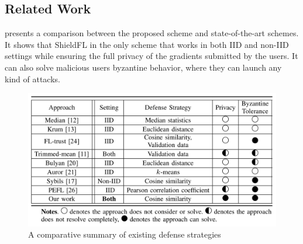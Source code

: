 \subsection{Related Work}
\label{sec:related-work}

 presents a comparison between the proposed scheme and state-of-the-art schemes.
It shows that ShieldFL in the only scheme that works in both IID and non-IID settings while ensuring the full privacy of the gradients submitted by the users.
It can also solve malicious users byzantine behavior, where they can launch any kind of attacks. 

\begin{figure}[thb]
\centering
  \includegraphics[width=0.8\linewidth]{resources/state-of-the-art-comarison.pdf}
  \caption{A comparative summary of existing defense strategies}
  \label{fig:comparison-with-state-of-the-art-schemes}
\end{figure}
